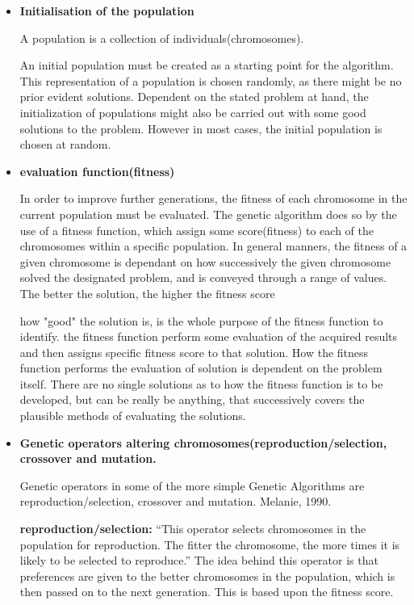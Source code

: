 \begin{itemize}
\item \textbf{Initialisation of the population}

A population is a collection of individuals(chromosomes).



An initial population must be created as a starting point for the algorithm. This representation of a population is chosen randomly, as there might be no prior evident solutions. Dependent on the stated problem at hand, the initialization of populations might also be carried out with some good solutions to the problem. However in most cases, the initial population is chosen at random. \cite[pp. 41/42]{Sivanandam2008}





\item \textbf{evaluation function(fitness)}

In order to improve further generations, the fitness of each chromosome in the current population must be evaluated. The genetic algorithm does so by the use of a fitness function, which assign some score(fitness) to each of the chromosomes within a specific population.
In general manners, the fitness of a given chromosome is dependant on how successively the given chromosome solved the designated problem, and is conveyed through a range of values. The better the solution, the higher the fitness score \cite[pp. 8]{Melanie1990}

how "good" the solution is, is the whole purpose of the fitness function to identify. the fitness function perform some evaluation of the acquired results and then assigns specific fitness score to that solution. How the fitness function performs the evaluation of solution is dependent on the problem itself. There are no single solutions as to how the fitness function is to be developed, but can be really be anything, that successively covers the plausible methods of evaluating the solutions. \cite[pp. 31]{Sivanandam2008}




\item \textbf{Genetic operators altering chromosomes(reproduction/selection, crossover and mutation.}


Genetic operators in some of the more simple Genetic Algorithms are reproduction/selection, crossover and mutation. Melanie, 1990. \cite{Melanie1990}

\textbf{reproduction/selection:} \enquote{This operator selects chromosomes in the population for reproduction. The fitter the chromosome, the more times it is likely to be selected to reproduce.} \cite[pp. 8]{Melanie1990}
The idea behind this operator is that preferences are given to the better chromosomes in the population, which is then passed on to the next generation. This is based upon the fitness score.


\end{itemize}
